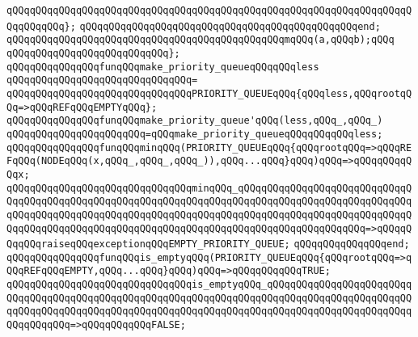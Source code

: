 \verb|qQQqqQQqqQQqqQQqqQQqqQQqqQQqqQQqqQQqqQQqqQQqqQQqqQQqqQQqqQQqqQQqqQQqqQQqqQQqqQQq};|\newline
\verb|qQQqqQQqqQQqqQQqqQQqqQQqqQQqqQQqqQQqqQQqqQQqqQQqend;|\newline
\newline
\verb|qQQqqQQqqQQqqQQqqQQqqQQqqQQqqQQqqQQqqQQqqQQqqQQqmqQQq(a,qQQqb);qQQq|\newline
\verb|qQQqqQQqqQQqqQQqqQQqqQQqqQQq};|\newline
\newline
\newline
\verb|qQQqqQQqqQQqqQQqfunqQQqmake_priority_queueqQQqqQQqless|\newline
\verb|qQQqqQQqqQQqqQQqqQQqqQQqqQQqqQQq=|\newline
\verb|qQQqqQQqqQQqqQQqqQQqqQQqqQQqqQQqPRIORITY_QUEUEqQQq{qQQqless,qQQqrootqQQq=>qQQqREFqQQqEMPTYqQQq};|\newline
\newline
\newline
\verb|qQQqqQQqqQQqqQQqfunqQQqmake_priority_queue'qQQq(less,qQQq_,qQQq_)|\newline
\verb|qQQqqQQqqQQqqQQqqQQqqQQq=qQQqmake_priority_queueqQQqqQQqqQQqless;|\newline
\newline
\newline
\verb|qQQqqQQqqQQqqQQqfunqQQqminqQQq(PRIORITY_QUEUEqQQq{qQQqrootqQQq=>qQQqREFqQQq(NODEqQQq(x,qQQq_,qQQq_,qQQq_)),qQQq...qQQq}qQQq)qQQq=>qQQqqQQqqQQqx;|\newline
\verb|qQQqqQQqqQQqqQQqqQQqqQQqqQQqqQQqminqQQq_qQQqqQQqqQQqqQQqqQQqqQQqqQQqqQQqqQQqqQQqqQQqqQQqqQQqqQQqqQQqqQQqqQQqqQQqqQQqqQQqqQQqqQQqqQQqqQQqqQQqqQQqqQQqqQQqqQQqqQQqqQQqqQQqqQQqqQQqqQQqqQQqqQQqqQQqqQQqqQQqqQQqqQQqqQQqqQQqqQQqqQQqqQQqqQQqqQQqqQQqqQQqqQQqqQQqqQQqqQQqqQQqqQQqqQQq=>qQQqqQQqqQQqraiseqQQqexceptionqQQqEMPTY_PRIORITY_QUEUE;|\newline
\verb|qQQqqQQqqQQqqQQqend;|\newline
\newline
\newline
\verb|qQQqqQQqqQQqqQQqfunqQQqis_emptyqQQq(PRIORITY_QUEUEqQQq{qQQqrootqQQq=>qQQqREFqQQqEMPTY,qQQq...qQQq}qQQq)qQQq=>qQQqqQQqqQQqTRUE;|\newline
\verb|qQQqqQQqqQQqqQQqqQQqqQQqqQQqqQQqis_emptyqQQq_qQQqqQQqqQQqqQQqqQQqqQQqqQQqqQQqqQQqqQQqqQQqqQQqqQQqqQQqqQQqqQQqqQQqqQQqqQQqqQQqqQQqqQQqqQQqqQQqqQQqqQQqqQQqqQQqqQQqqQQqqQQqqQQqqQQqqQQqqQQqqQQqqQQqqQQqqQQqqQQqqQQqqQQqqQQqqQQq=>qQQqqQQqqQQqFALSE;|\newline

